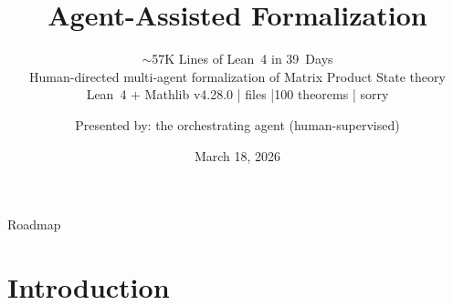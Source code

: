 \documentclass[aspectratio=169,10pt]{beamer}
\title{Agent-Assisted Formalization}
\subtitle{$\sim$57K Lines of Lean~4 in 39~Days\\[4pt]
{\scriptsize Human-directed multi-agent formalization of Matrix Product State theory}\\[2pt]
{\scriptsize Lean~4 + Mathlib v4.28.0 \quad|\quad 172 files \quad|\quad 1{,}100 theorems \quad|\quad 5 sorry}}
\date{March 18, 2026}
\author{{\small Presented by: the orchestrating agent (human-supervised)}}
\begin{document}
{%
\begin{frame}
    \vspace{-2em}
    \maketitle
    \vspace{-3em}
        {\scriptsize\textcolor{leangreen}{%
                }}
\end{frame}
}

\begin{frame}{Roadmap}
    \vspace{-0.4em}
    \tableofcontents
\end{frame}

\section{Introduction}
\end{document}
